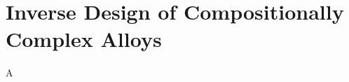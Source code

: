 \chapter{Inverse Design of Compositionally Complex Alloys} \label{chap:inversedesign}

A

\printbibliography[heading=subbibintoc]